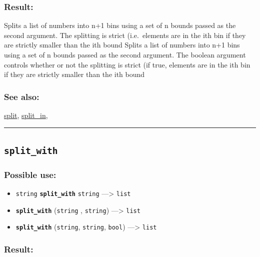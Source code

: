 \documentclass[]{book}
\providecommand{\tightlist}{%
  \setlength{\itemsep}{0pt}\setlength{\parskip}{0pt}}
\theoremstyle{definition}
\theoremstyle{definition}
\theoremstyle{definition}
\theoremstyle{remark}
\begin{document}
\subsubsection{Result:}\label{result-480}

Splits a list of numbers into n+1 bins using a set of n bounds passed as
the second argument. The splitting is strict (i.e.~elements are in the
ith bin if they are strictly smaller than the ith bound Splits a list of
numbers into n+1 bins using a set of n bounds passed as the second
argument. The boolean argument controls whether or not the splitting is
strict (if true, elements are in the ith bin if they are strictly
smaller than the ith bound

\subsubsection{See also:}\label{see-also-194}

\href{operators-s-to-z.html\#split}{split},
\href{operators-s-to-z.html\#split_in}{split\_in},

\begin{center}\rule{0.5\linewidth}{\linethickness}\end{center}

\subsection{\texorpdfstring{\texttt{split\_with}}{split\_with}}\label{split_with}

\subsubsection{Possible use:}\label{possible-use-497}

\begin{itemize}
\tightlist
\item
  \texttt{string} \textbf{\texttt{split\_with}} \texttt{string}
  ---\textgreater{} \texttt{list}
\item
  \textbf{\texttt{split\_with}} (\texttt{string} , \texttt{string})
  ---\textgreater{} \texttt{list}
\item
  \textbf{\texttt{split\_with}} (\texttt{string}, \texttt{string},
  \texttt{bool}) ---\textgreater{} \texttt{list}
\end{itemize}

\subsubsection{Result:}\label{result-481}
\end{document}
